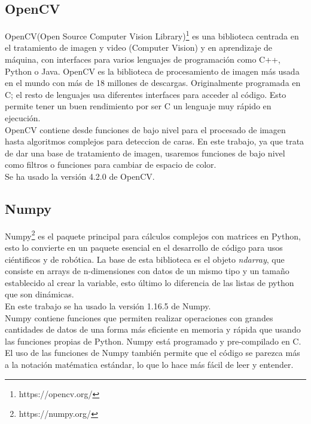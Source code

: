 \subsection{OpenCV}

OpenCV(Open Source Computer Vision Library)\footnote{https://opencv.org/} es una biblioteca centrada en el tratamiento de imagen y video (Computer Vision) y en aprendizaje de máquina, con interfaces para varios lenguajes de programación como C++, Python o Java. OpenCV es la biblioteca de procesamiento de imagen más usada en el mundo con más de 18 millones de descargas. Originalmente programada en C; el resto de lenguajes usa diferentes interfaces para acceder al código. Esto permite tener un buen rendimiento por ser C un lenguaje muy rápido en ejecución.\\

OpenCV contiene desde funciones de bajo nivel para el procesado de imagen hasta algoritmos complejos para deteccion de caras. En este trabajo, ya que trata de dar una base de tratamiento de imagen, usaremos funciones de bajo nivel como filtros o funciones para cambiar de espacio de color.\\

Se ha usado la versión 4.2.0 de OpenCV.\\


\subsection{Numpy}

Numpy\footnote{https://numpy.org/} es el paquete principal para cálculos complejos con matrices en Python, esto lo convierte en un paquete esencial en el desarrollo de código para usos ciéntificos y de robótica. La base de esta biblioteca es el objeto \emph{ndarray}, que consiste en arrays de n-dimensiones con datos de un mismo tipo y un tamaño establecido al crear la variable, esto último lo diferencia de las listas de python que son dinámicas.\\

En este trabajo se ha usado la versión 1.16.5 de Numpy.\\

Numpy contiene funciones que permiten realizar operaciones con grandes cantidades de datos de una forma más eficiente en memoria y rápida que usando las funciones propias de Python. Numpy está programado y pre-compilado en C. El uso de las funciones de Numpy también permite que el código se parezca más a la notación matématica estándar, lo que lo hace más fácil de leer y entender.\\


